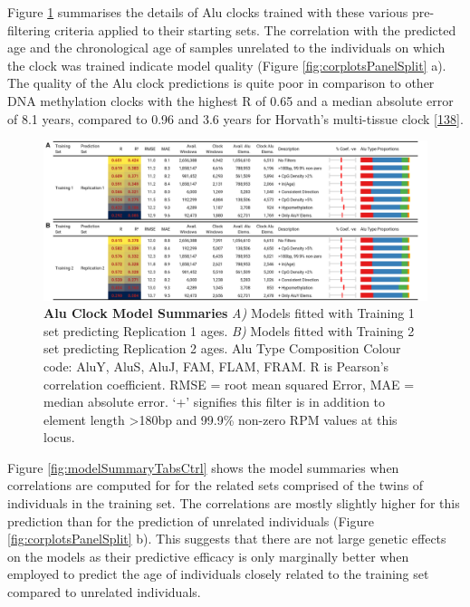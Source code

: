\documentclass[
]{book}
\begin{document}
Figure \ref{fig:modelSummaryTabsMain} summarises the details of Alu clocks trained with these various pre-filtering criteria applied to their starting sets.
The correlation with the predicted age and the chronological age of samples unrelated to the individuals on which the clock was trained indicate model quality (Figure \ref{fig:corplotsPanelSplit} a).
The quality of the Alu clock predictions is quite poor in comparison to other DNA methylation clocks with the highest R of 0.65 and a median absolute error of 8.1 years, compared to 0.96 and 3.6 years for Horvath's multi-tissue clock {[}\protect\hyperlink{ref-Horvath2013}{138}{]}.

\begin{figure}

{\centering \includegraphics[width=1\linewidth]{./figs/model_summary_tabs_main} 

}

\caption{\textbf{Alu Clock Model Summaries} \emph{A)} Models fitted with Training 1 set predicting Replication 1 ages. \emph{B)} Models fitted with Training 2 set predicting Replication 2 ages. Alu Type Composition Colour code: \textcolor[HTML]{e41a1c}{AluY}, \textcolor[HTML]{377eb8}{AluS}, \textcolor[HTML]{4daf4a}{AluJ}, \textcolor[HTML]{984ea3}{FAM}, \textcolor[HTML]{ff7f00}{FLAM}, \textcolor[HTML]{ffff33}{FRAM}. R is Pearson's correlation coefficient. RMSE = root mean squared Error, MAE = median absolute error. `+' signifies this filter is in addition to element length \textgreater180bp and 99.9\% non-zero RPM values at this locus.}\label{fig:modelSummaryTabsMain}
\end{figure}



Figure \ref{fig:modelSummaryTabsCtrl} shows the model summaries when correlations are computed for for the related sets comprised of the twins of individuals in the training set.
The correlations are mostly slightly higher for this prediction than for the prediction of unrelated individuals (Figure \ref{fig:corplotsPanelSplit} b).
This suggests that there are not large genetic effects on the models as their predictive efficacy is only marginally better when employed to predict the age of individuals closely related to the training set compared to unrelated individuals.
\end{document}
